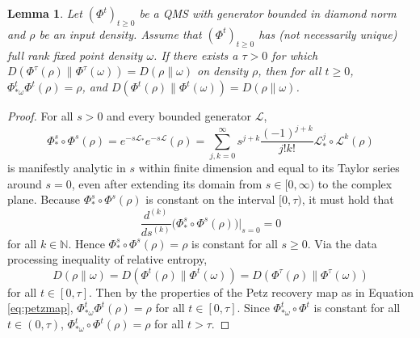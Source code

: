 \documentclass[accepted=2026-02-01, letterpaper]{quantumarticle}
\newtheorem{lemma}{Lemma}[section]
\newcommand{\NN}{\mathbb{N}}
\newcommand{\pl}{\hspace{.1cm}}
\renewcommand{\L}{\mathcal{L}}
\newcommand{\Id}{\mathrm{Id}}
\begin{document}
\begin{lemma} \label{lem:analyt}
    Let $(\Phi^t)_{t \geq 0}$ be a QMS with generator bounded in diamond norm and $\rho$ be an input density.
    Assume that $(\Phi^{t})_{t \geq 0}$ has (not necessarily unique) full rank fixed point density $\omega$. If there exists a $\tau > 0$ for which $D(\Phi^{\tau}(\rho) \| \Phi^{\tau}(\omega)) = D(\rho \| \omega)$ on density $\rho$, then for all $t \geq 0$, $\Phi^{t}_{* \omega} \Phi^{t}(\rho) = \rho$, and $D(\Phi^{t}(\rho) \| \Phi^{t}(\omega)) = D(\rho \| \omega)$.
\end{lemma}
\begin{proof}

For all $s > 0$ and every bounded generator $\L$,
\[ \Phi^s_* \circ \Phi^s (\rho)
    = e^{- s \L_*} e^{- s \L} (\rho)
    = \sum_{j,k = 0}^\infty s^{j+k} \frac{(-1)^{j + k}}{j! k!} \L^j_* \circ \L^k (\rho) \]
is manifestly analytic in $s$ within finite dimension and equal to its Taylor series around $s=0$, even after extending its domain from $s \in [0,\infty)$ to the complex plane. Because $\Phi^s_* \circ \Phi^s(\rho)$ is constant on the interval $[0, \tau)$, it must hold that
\[ \frac{d^{(k)}}{ds^{(k)}}
    \big ( \Phi^s_* \circ \Phi^s(\rho) \big ) \Big |_{s=0} = 0 \]
for all $k \in \NN$. Hence $\Phi^s_* \circ \Phi^s(\rho) = \rho$ is constant for all $s \geq 0$. Via the data processing inequality of relative entropy,
\[ D(\rho \| \omega) = D(\Phi^{t}(\rho) \| \Phi^{t}(\omega)) = D(\Phi^{\tau}(\rho) \| \Phi^{\tau}(\omega))\]
for all $t \in [0,\tau]$. Then by the properties of the Petz recovery map as in Equation \eqref{eq:petzmap}, $\Phi^{t}_{*\omega} \Phi^{t}(\rho) = \rho$ for all $t \in [0,\tau]$. Since $\Phi^{t}_{*\omega} \circ \Phi^{t}$ is constant for all $t \in (0, \tau)$, $\Phi_{*\omega}^{t} \circ \Phi^{t}(\rho) = \rho$ for all $t > \tau$.
\end{proof}
\end{document}
